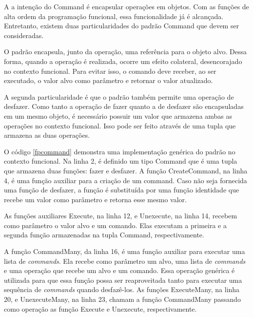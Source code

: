 A a intenção do Command é encapsular operações 
em objetos. Com as funções de alta ordem da programação 
funcional, essa funcionalidade já é alcançada. 
Entretanto, existem duas particularidades 
do padrão Command que devem ser consideradas. 

O padrão encapsula, junto da operação, uma 
referência para o objeto alvo. Dessa forma, 
quando a operação é realizada, ocorre 
um efeito colateral, desencorajado 
no contexto funcional. Para evitar isso, o 
comando deve receber, ao ser executado, o 
valor alvo como parâmetro e retornar o 
valor atualizado.

A segunda particularidade é que o padrão 
também permite uma operação de desfazer. Como 
tanto a operação de fazer quanto a de desfazer 
são encapsuladas em um mesmo objeto, é necessário 
possuir um valor que armazena ambas as operações 
no contexto funcional. Isso pode ser feito 
através de uma tupla que armazena as duas 
operações.

O código \ref{fpcommand} demonstra uma implementação 
genérica do padrão no contexto funcional. Na linha 2, 
é definido um tipo Command que é uma tupla que 
armazena duas funções: fazer e desfazer. A função 
CreateCommand, na linha 4, é uma função auxiliar para 
a criação de um command. Caso não seja fornecida 
uma função de desfazer, a função é substituída por 
uma função identidade que recebe um valor como 
parâmetro e retorna esse mesmo valor.

As funções auxiliares Execute, na linha 12, e 
Unexecute, na linha 14, recebem como parâmetro o valor 
alvo e um comando. Elas executam a primeira e a 
segunda função armazenadas na tupla Command, 
respectivamente.

A função CommandMany, da linha 16, é uma função auxiliar 
para executar uma lista de \textit{commands}. Ela recebe 
como parâmetro um alvo, uma lista de \textit{commands} e 
uma operação que recebe um alvo e um comando. Essa 
operação genérica é utilizada para que essa função 
possa ser reaproveitada tanto para executar uma 
sequência de \textit{commands} quando desfazê-los. 
As funções ExecuteMany, na linha 20, e UnexecuteMany, 
na linha 23, chamam a função CommandMany passando 
como operação as função Execute e Unexecute, 
respectivamente.


